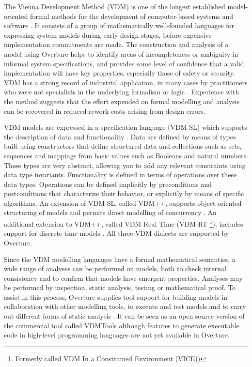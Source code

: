 \documentclass{overturerepchap}
\begin{document}
The Vienna Development Method (VDM) is one of the longest established
model-oriented formal methods for the development of computer-based
systems and software
\cite{Bjorner&78,Jones90a,Fitzgerald&08c}. It consists of a
group of mathematically well-founded languages for expressing system
models during early design stages, before expensive implementation
commitments are made. The construction and analysis of a model using
Overture helps to identify areas of incompleteness or ambiguity in
informal system specifications, and provides some level of confidence
that a valid implementation will have key properties, especially those
of safety or security. VDM has a strong record of industrial
application, in many cases by practitioners who were not specialists in
the underlying formalism or logic
\cite{Larsen&95b,Clement&99,Kurita&09}. Experience with the method
suggests that the effort expended on formal modelling and analysis can
be recovered in reduced rework costs arising from design errors.

VDM models are expressed in a specification language (VDM-SL) which
supports the description of data and functionality
\cite{ISOVDM96a,Fitzgerald&98b,Fitzgerald&09}. Data are defined by
means of types built using constructors that define structured data
and collections such as sets, sequences and mappings from basic values
such as Booleans and natural numbers. These types are very abstract, allowing
you to add any relevant constraints using data type
invariants. Functionality is defined in terms of operations over these
data types. Operations can be defined implicitly by preconditions and
postconditions that characterize their behavior, or explicitly by
means of specific algorithms. An extension of VDM-SL, called VDM++,
supports object-oriented structuring of models and permits direct
modelling of concurrency \cite{Fitzgerald&05}. An additional extension
to VDM++, called VDM Real Time (VDM-RT \footnote{Formerly called VDM In a
Constrained Environment (VICE))}), includes support for discrete
time models \cite{Mukherjee&00,Verhoef&06b}. All
three VDM dialects are supported by Overture.

Since the VDM modelling languages have a formal mathematical semantics,
a wide range of analyses can be performed on models, both to check
internal consistency and to confirm that models have emergent
properties. Analyses may be performed by inspection, static analysis,
testing or mathematical proof. To assist in this process, Overture
supplies tool support for building models in collaboration with other
modelling tools, to execute and test models and to carry out different
forms of static analysis \cite{Larsen&10a}. It can be seen as an open
source version of the commercial tool called VDMTools
\cite{Elmstrom&94,Larsen01,Fitzgerald&08a} although features to
generate executable code in high-level programming languages are
not yet available in Overture.
\end{document}
